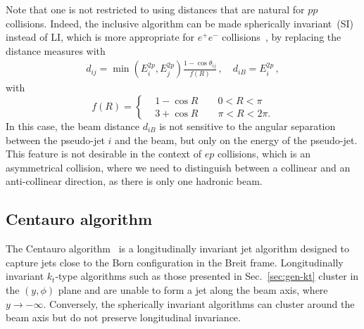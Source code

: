 Note that one is not restricted to using distances that are natural for $pp$ collisions. 
%
Indeed, the inclusive algorithm can be made spherically invariant~(SI) instead of LI, which is more appropriate for $e^+e^-$ collisions~\cite{Cacciari:2011ma}, by
replacing the distance measures with
\begin{align}
\label{eq:eegen}
  d_{ij} = \min(E_{i}^{2p},E_{j}^{2p}) \frac{1-\cos\theta_{ij}}{f(R)}\,,\quad d_{iB} = E_{i}^{2p}\,,
\end{align}
with
\begin{equation}
  f(R) = \begin{cases}
    &1-\cos R \qquad 0< R < \pi \\
    &3+\cos R \qquad  \pi < R < 2\pi.
  \end{cases}
  \label{eq:fR}
\end{equation}
In this case, the beam distance $d_{iB}$ is not sensitive to the
angular separation between the pseudo-jet $i$ and the beam, but only
on the energy of the pseudo-jet.
%
This feature is not desirable in the context of $ep$ collisions,
which is an asymmetrical collision, where we need to distinguish
between a collinear and an anti-collinear direction, as there is only
one hadronic beam.

\subsection{Centauro algorithm}
\label{sec:centauro}
The Centauro algorithm~\cite{Arratia:2020ssx} is a longitudinally
invariant jet algorithm designed to capture jets close to the Born
configuration in the Breit frame. Longitudinally invariant $k_t$-type
algorithms such as those presented in Sec.~\ref{sec:gen-kt} cluster in the
$(y,\phi)$ plane and are unable to form a jet along the beam axis,
where $y \to -\infty$. Conversely, the spherically invariant
algorithms can cluster around the beam axis but do not preserve
longitudinal invariance.

